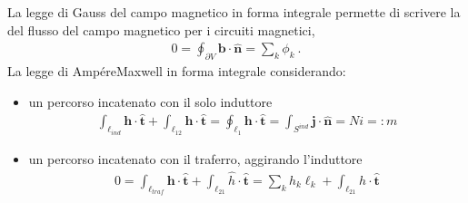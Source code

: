 \documentclass[letterpaper,10pt,english]{jupyterBook}
\begin{document}
\sphinxAtStartPar
La legge di Gauss del campo magnetico in forma integrale permette di scrivere la  del flusso del campo magnetico per i circuiti magnetici,
\begin{equation*}
\begin{split}0 = \oint_{\partial V} \mathbf{b} \cdot \hat{\mathbf{n}} = \sum_k \phi_k \ .\end{split}
\end{equation*}
\sphinxAtStartPar
La legge di Ampére\sphinxhyphen{}Maxwell in forma integrale considerando:
\begin{itemize}
\item {} 
\sphinxAtStartPar
un percorso incatenato con il solo induttore
\begin{equation*}
\begin{split}\int_{\ell_{ind}} \mathbf{h} \cdot \hat{\mathbf{t}} + \int_{\ell_{12}} \mathbf{h} \cdot \hat{\mathbf{t}} = \oint_{\ell_{1}} \mathbf{h} \cdot \hat{\mathbf{t}} = \int_{S^{ind}} \mathbf{j} \cdot \hat{\mathbf{n}} =  N i =: m\end{split}
\end{equation*}
\item {} 
\sphinxAtStartPar
un percorso incatenato con il traferro, aggirando l’induttore
\begin{equation*}
\begin{split}0 = \int_{\ell_{traf}} \mathbf{h} \cdot \hat{\mathbf{t}} + \int_{\ell_{21}} \hat{h} \cdot \hat{\mathbf{t}} = \sum_{k} h_k \ell_k + \int_{\ell_{21}} \hat{h} \cdot \hat{\mathbf{t}}\end{split}
\end{equation*}
\end{itemize}
\end{document}
